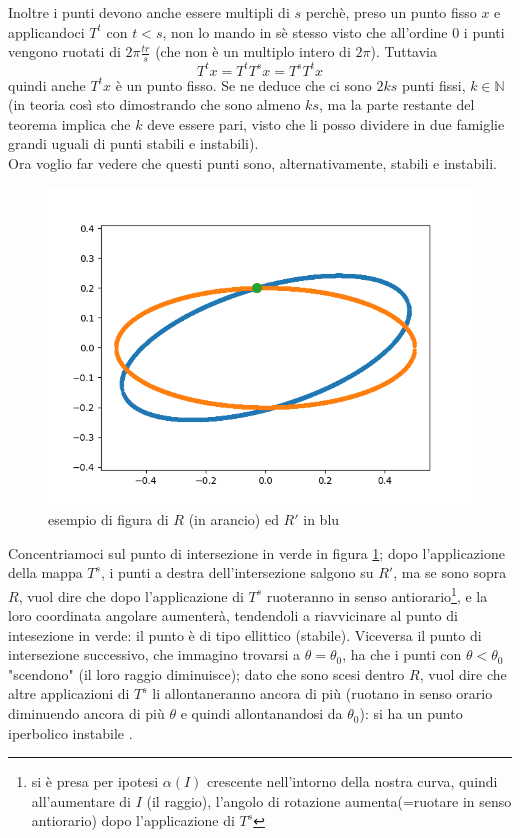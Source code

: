 \documentclass[a4paper,12pt]{article}
\theoremstyle{plain}
\theoremstyle{definition}
\newcommand{\f}[2]{\frac{#1}{#2}}
\theoremstyle{remark}
\begin{document}
Inoltre i punti devono anche essere multipli di $s$ perchè, preso un punto fisso $x$ e applicandoci $T^t$ con $t<s$, non lo mando in sè stesso visto che all'ordine $0$ i punti vengono ruotati di $2\pi \f{t r}{s}$ (che non è un multiplo intero di $2\pi$). Tuttavia 
\[T^t x=T^t T^s x= T^s T^t x		\]
quindi anche $T^tx$ è un punto fisso. Se ne deduce che ci sono $2ks$ punti fissi, $k\in\mathbb{N}$ (in teoria così sto dimostrando che sono almeno $k s$, ma la parte restante del teorema implica che  $k$ deve essere pari, visto che li  posso dividere in due famiglie grandi uguali di punti stabili e instabili).\\
Ora voglio far vedere che questi punti sono, alternativamente, stabili e instabili.
\begin{figure}[h]
	\centering
	\includegraphics[scale=0.5]{exmp}
	\caption{esempio di figura di $R$ (in arancio) ed $R'$ in blu}
	\label{yourmother}
\end{figure}
Concentriamoci sul punto di intersezione in verde in figura \ref{yourmother}; dopo l'applicazione della mappa $T^s$, i punti a destra dell'intersezione salgono su $R'$, ma se sono sopra $R$, vuol dire che dopo l'applicazione di $T^s$ ruoteranno in senso antiorario\footnote{si è presa per ipotesi $\alpha(I)$ crescente nell'intorno della nostra curva, quindi all'aumentare di $I$ (il raggio), l'angolo di rotazione aumenta(=ruotare in senso antiorario) dopo l'applicazione di $T^s$}, e la loro coordinata angolare aumenterà, tendendoli a riavvicinare al punto di intesezione in verde: il punto è di tipo ellittico (stabile). Viceversa il punto di intersezione successivo, che immagino trovarsi a $\theta=\theta_0$, ha che i punti con $\theta<\theta_0$ "scendono" (il loro raggio diminuisce); dato che sono scesi dentro $R$, vuol dire che altre applicazioni di $T^s$ li allontaneranno ancora di più (ruotano in senso orario diminuendo ancora di più $\theta$ e quindi allontanandosi da $\theta_0$): si ha un punto iperbolico instabile . 
\end{document}
